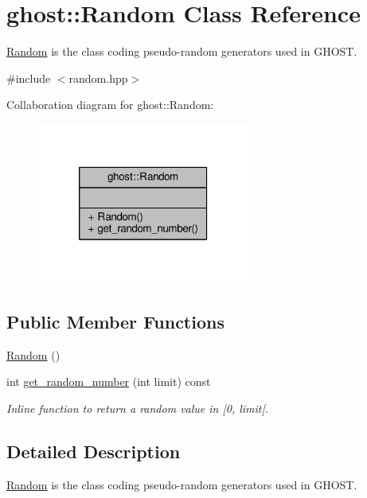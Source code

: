 \hypertarget{classghost_1_1Random}{\section{ghost\-:\-:Random Class Reference}
\label{classghost_1_1Random}
}


\hyperlink{classghost_1_1Random}{Random} is the class coding pseudo-\/random generators used in G\-H\-O\-S\-T.  




{\ttfamily \#include $<$random.\-hpp$>$}



Collaboration diagram for ghost\-:\-:Random\-:
\nopagebreak
\begin{figure}[H]
\begin{center}
\leavevmode
\includegraphics[width=198pt]{classghost_1_1Random__coll__graph}
\end{center}
\end{figure}
\subsection*{Public Member Functions}
\begin{DoxyCompactItemize}
\item 
\hyperlink{classghost_1_1Random_a7c45efd1f7c522a68760104ba6084d89}{Random} ()
\item 
int \hyperlink{classghost_1_1Random_acc4f1a79621ed8d77c303cecda571034}{get\-\_\-random\-\_\-number} (int limit) const 
\begin{DoxyCompactList}\small\item\em Inline function to return a random value in \mbox{[}0, limit\mbox{[}. \end{DoxyCompactList}\end{DoxyCompactItemize}


\subsection{Detailed Description}
\hyperlink{classghost_1_1Random}{Random} is the class coding pseudo-\/random generators used in G\-H\-O\-S\-T. 

